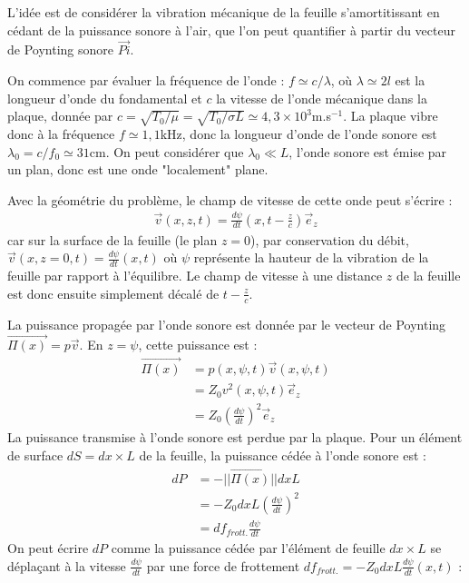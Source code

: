 \begin{correction}

L'idée est de considérer la vibration mécanique de la feuille s'amortitissant en cédant de la puissance sonore à l'air, que l'on peut quantifier à partir du vecteur de Poynting sonore $\vec{Pi}$.

On commence par évaluer la fréquence de l'onde : $f\simeq c/\lambda$, où $\lambda\simeq 2l$ est la longueur d'onde du fondamental et $c$ la vitesse de l'onde mécanique dans la plaque, donnée par $c=\sqrt{T_0/\mu}=\sqrt{T_0/\sigma L}\simeq4,3\times10^3$m.s$^{-1}$. La plaque vibre donc à la fréquence $f\simeq 1,1$kHz, donc la longueur d'onde de l'onde sonore est $\lambda_0=c/f_0\simeq31$cm. On peut considérer que $\lambda_0 \ll L$, l'onde sonore est émise par un plan, donc est une onde "localement" plane. 

Avec la géométrie du problème, le champ de vitesse de cette onde peut s'écrire :
\begin{align*}
	\vec{v}(x,z,t)=\frac{d\psi}{dt}\left(x,t-\frac{z}{c}\right) \vec{e}_z
\end{align*}
car sur la surface de la feuille (le plan $z=0$), par conservation du débit, $\vec{v}(x,z=0,t)=\frac{d\psi}{dt}(x,t)$ où $\psi$ représente la hauteur de la vibration de la feuille par rapport à l'équilibre. Le champ de vitesse à une distance $z$ de la feuille est donc ensuite simplement décalé de $t-\frac{z}{c}$. 

La puissance propagée par l'onde sonore est donnée par le vecteur de Poynting $\vec{\Pi(x)}=p\vec{v}$. En $z=\psi$, cette puissance est :
\begin{align*}
	\vec{\Pi(x)}&=p(x,\psi,t)\vec{v}(x,\psi,t) \\
	&=Z_0v^2(x,\psi,t)\vec{e}_z \\
	&=Z_0\left( \frac{d\psi}{dt}\right)^2\vec{e}_z
\end{align*}
La puissance transmise à l'onde sonore est perdue par la plaque. Pour un élément de surface $dS=dx\times L$ de la feuille, la puissance cédée à l'onde sonore est :
\begin{align*}
	dP&=-||\vec{\Pi(x)}||dxL \\
	&=-Z_0dxL\left( \frac{d\psi}{dt}\right)^2 \\
	&=df_{frott.}\frac{d\psi}{dt}
\end{align*}
On peut écrire $dP$ comme la puissance cédée par l'élément de feuille $dx\times L$ se déplaçant à la vitesse $\frac{d\psi}{dt}$ par une force de frottement $df_{frott.}=-Z_0dxL\frac{d\psi}{dt}(x,t)$ :


\end{correction}
